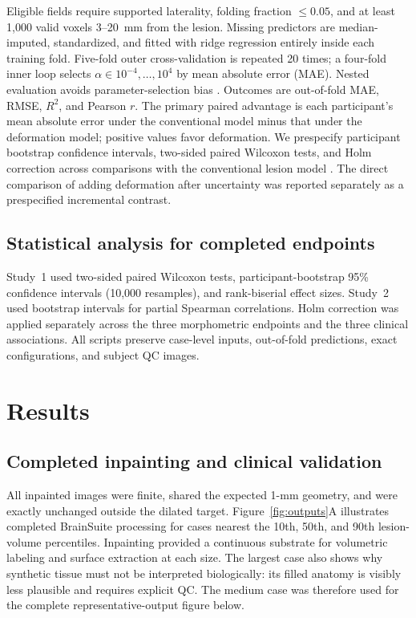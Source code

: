 \documentclass[runningheads]{llncs}
\begin{document}
Eligible fields require supported laterality, folding fraction $\leq0.05$, and
at least 1,000 valid voxels 3--20~mm from the lesion. Missing predictors are
median-imputed, standardized, and fitted with ridge regression entirely inside
each training fold. Five-fold outer cross-validation is repeated 20 times; a
four-fold inner loop selects $\alpha\in10^{-4},\ldots,10^4$ by mean absolute
error (MAE). Nested evaluation avoids parameter-selection bias
\cite{Varma2006}. Outcomes are out-of-fold MAE, RMSE, $R^2$, and Pearson $r$.
The primary paired advantage is each participant's mean absolute error under
the conventional model minus that under the deformation model; positive values
favor deformation. We prespecify participant bootstrap confidence intervals,
two-sided paired Wilcoxon tests, and Holm correction across comparisons with
the conventional lesion model \cite{Holm1979}. The direct comparison of adding
deformation after uncertainty was reported separately as a prespecified
incremental contrast.

\subsection{Statistical analysis for completed endpoints}
Study~1 used two-sided paired Wilcoxon tests, participant-bootstrap 95\%
confidence intervals (10,000 resamples), and rank-biserial effect sizes.
Study~2 used bootstrap intervals for partial Spearman correlations. Holm
correction was applied separately across the three morphometric endpoints and
the three clinical associations. All scripts preserve case-level inputs,
out-of-fold predictions, exact configurations, and subject QC images.

\section{Results}

\subsection{Completed inpainting and clinical validation}
All \ArcNAnalyzed{} inpainted images were finite, shared the expected 1-mm
geometry, and were exactly unchanged outside the dilated target.
Figure~\ref{fig:outputs}A illustrates completed BrainSuite processing for
cases nearest the 10th, 50th, and 90th lesion-volume percentiles. Inpainting
provided a continuous substrate for volumetric labeling and surface extraction
at each size. The largest case also shows why synthetic tissue must not be
interpreted biologically: its filled anatomy is visibly less plausible and
requires explicit QC. The medium case was therefore used for the complete
representative-output figure below.
\end{document}
